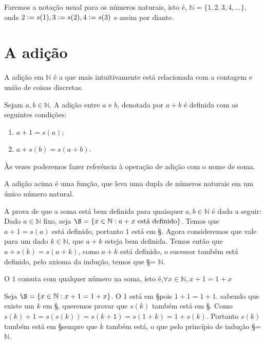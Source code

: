 \documentclass[../main.tex]{subfiles}
\begin{document}
Faremos a notação usual para os números naturais, isto é, $\mathbb{N} = \{ 1, 2, 3, 4, ...\}$, onde $2 \vcentcolon= s(1), 3 \vcentcolon= s(2), 4 \vcentcolon= s(3)$ e assim por diante.



\section{A adição}
A adição em $\mathbb{N}$ é a que mais intuitivamente está relacionada com a contagem e união de coisas discretas.
\begin{defi}\label{def-adicao-N}
Sejam $a, b \in \mathbb{N}$. A adição entre $a$ e $b$, denotada por $a + b$ é definida com as seguintes condições: 
    \begin{enumerate}[label=(\roman*)]
        \item $a + 1 = s(a)$;
        \item $a + s(b) = s(a+b)$.
    \end{enumerate}
\end{defi}
Às vezes poderemos fazer referência à operação de adição com o nome de soma.

\begin{teo}
    A adição acima é uma função, que leva uma dupla de números naturais em um único número natural.
\end{teo}
\begin{dem}
    A prova de que a soma está bem definida para quaisquer $a,b \in \mathbb{N}$ é dada a seguir:
    Dado $a \in \mathbb{N}$ fixo, seja $\S = \{ x \in \mathbb{N} : a + x \ \text{está definido} \}$. Temos que $a + 1 = s(a)$ está definido, portanto $1$ está em \S. 
    Agora consideremos que vale para um dado $k \in \mathbb{N}$, que $a+k$ esteja bem definida. Temos então que $a + s(k) = s(a+k)$, como $a+k$ está definido, o sucessor também está definido, pelo axioma da indução, temos que \S = $\mathbb{N}$.
\end{dem}
\begin{lema}\label{soma-n-um-comut}
    O $1$ comuta com qualquer número na soma, isto é,$ \forall x \in \mathbb{N}, x + 1 = 1 + x$
\end{lema}
\begin{dem}
    Seja $\S = \{ x \in \mathbb{N} : x + 1 = 1 + x\}$. O $1$ está em \S pois $1 + 1 = 1 + 1$.
    sabendo que existe um $k$ em \S, queremos provar que $s(k)$ também está em \S. Como
    $s(k) + 1 = s(s(k)) = s(k+1) = s(1+k) = 1 + s(k)$. Portanto $s(k)$ também está em \S sempre que $k$ também está, o que pelo princípio de indução \S = $\mathbb{N}$.
\end{dem} \\
\end{document}
